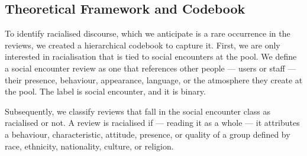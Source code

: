%

\subsection{Theoretical Framework and Codebook}
To identify racialised discourse, which we anticipate is a rare occurrence in the reviews, we created a hierarchical codebook to capture it.
First, we are only interested in racialisation that is tied to social encounters at the pool. We define a social encounter review as one that references other people --- users or staff --- their presence, behaviour, appearance, language, or the atmosphere they create at the pool. The label is social encounter, and it is binary.

Subsequently, we classify reviews that fall in the social encounter class as racialised or not. A review is racialised if --- reading it as a whole --- it attributes a behaviour, characteristic, attitude, presence, or quality of a group defined by race, ethnicity, nationality, culture, or religion.

